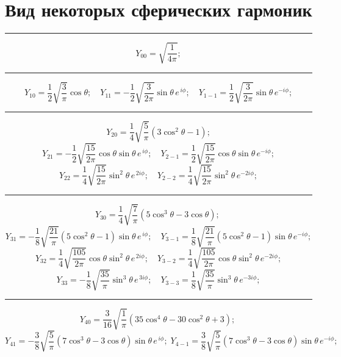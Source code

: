 \setmainfont{Noto Serif}
\setsansfont{Noto Sans}
\setmonofont{Noto Sans Mono}

\section{Вид некоторых сферических гармоник}
\rule{\textwidth}{0.4pt}
\[ \textit{Y}_{00}=\sqrt{\frac{1}{4\pi}};\]
\rule{\textwidth}{0.4pt}
\[\textit{Y}_{10}=\frac{1}{2}\sqrt{\frac{3}{\pi}}\cos {\theta}; \quad \textit{Y}_{11}=-\frac{1}{2}\sqrt{\frac{3}{2\pi}}\sin{\theta} \, e^{\,i\phi};\quad \textit{Y}_{1-1}=\frac{1}{2}\sqrt{\frac{3}{2\pi}}\sin{\theta} \, e^{-i\phi}; \]
\rule{\textwidth}{0.4pt}
\[ \textit{Y}_{20}=\frac{1}{4}\sqrt{\frac{5}{\pi}}\left( 3 \cos^2{\theta}-1 \right);\] 
\[\textit{Y}_{21}=-\frac{1}{2}\sqrt{\frac{15}{2\pi}}\cos{\theta} \sin{\theta}\, e^{\,i\phi};\quad \textit{Y}_{2-1}=\frac{1}{2}\sqrt{\frac{15}{2\pi}}\cos{\theta} \sin{\theta}\, e^{-i\phi};
\]\hspace{\parindent}
\[ \textit{Y}_{22}=\frac{1}{4}\sqrt{\frac{15}{2\pi}} \sin^2 {\theta} \, e^{\,2i\phi}; \quad
\textit{Y}_{2-2}=\frac{1}{4}\sqrt{\frac{15}{2\pi}} \sin^2 {\theta} \, e^{-2i\phi};
\]
\rule{\textwidth}{0.4pt}
\[ \textit{Y}_{30}=\frac{1}{4}\sqrt{\frac{7}{\pi}}\left(5 \cos^3{\theta}-3\cos{\theta} \right);\ \]
\[\textit{Y}_{31}=-\frac{1}{8}\sqrt{\frac{21}{\pi}}\left(5\cos^2{\theta}-1 \right)\sin{\theta}\, e^{\,i\phi};\quad \textit{Y}_{3-1}=\frac{1}{8}\sqrt{\frac{21}{\pi}}\left( 5\cos^2{\theta}-1 \right)\sin{\theta}\, e^{-i\phi};
\]\hspace{\parindent}
\[\textit{Y}_{32}=\frac{1}{4}\sqrt{\frac{105}{2\pi}}\cos{\theta} \sin^2{\theta}\, e^{\,2i\phi};\quad \textit{Y}_{3-2}=\frac{1}{4}\sqrt{\frac{105}{2\pi}}\cos{\theta} \sin^2{\theta}\, e^{-2i\phi};
\]\hspace{\parindent}
\[ \textit{Y}_{33}=-\frac{1}{8}\sqrt{\frac{35}{\pi}} \sin^3 {\theta} \, e^{\,3i\phi}; \quad
\textit{Y}_{3-3}=\frac{1}{8}\sqrt{\frac{35}{\pi}} \sin^3 {\theta} \, e^{-3i\phi};
\]
\rule{\textwidth}{0.4pt}
\[ \textit{Y}_{40}=\frac{3}{16}\sqrt{\frac{1}{\pi}}\left(35 \cos^4{\theta}-30\cos^2{\theta}+3 \right);\ \]
\[\textit{Y}_{41}=-\frac{3}{8}\sqrt{\frac{5}{\pi}} \left(7\cos^3{\theta}-3\cos{\theta}\right)\sin{\theta}\, e^{\,i\phi};\; \textit{Y}_{4-1}=\frac{3}{8}\sqrt{\frac{5}{\pi}}\left(7\cos^3{\theta}-3\cos{\theta}\right)\sin{\theta}\, e^{-i\phi};
\]\hspace{\parindent}
